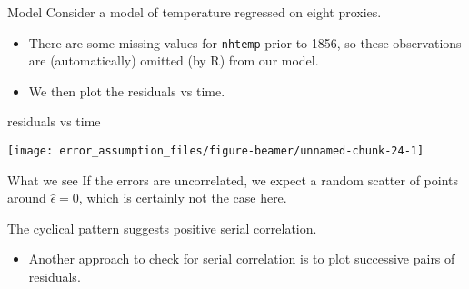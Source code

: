 \begin{frame}[fragile]{Model}
\protect\hypertarget{model}{}
Consider a model of temperature regressed on eight proxies.

\begin{itemize}
\item
  There are some missing values for \texttt{nhtemp} prior to 1856, so
  these observations are (automatically) omitted (by R) from our model.
\item
  We then plot the residuals vs time.
\end{itemize}

\begin{Shaded}
\begin{Highlighting}[]
\NormalTok{)}
\StringTok{ }\OperatorTok{\textasciitilde{}}\StringTok{ }\OperatorTok{+}\StringTok{ }\OperatorTok{+}\StringTok{ }\OperatorTok{+}
\StringTok{          }\OperatorTok{+}\StringTok{ }\OperatorTok{+}\StringTok{ }\OperatorTok{+}\StringTok{ }
\StringTok{          }\OperatorTok{+}\StringTok{ }
\end{Highlighting}
\end{Shaded}
\end{frame}

\begin{frame}[fragile]{residuals vs time}
\protect\hypertarget{residuals-vs-time}{}
\begin{Shaded}
\begin{Highlighting}[]
\NormalTok{(}\OperatorTok{\textasciitilde{}}\StringTok{ }
       \NormalTok{)}
\NormalTok{(} \NormalTok{)}
\end{Highlighting}
\end{Shaded}

\begin{center}\texttt{[image: error\_assumption\_files/figure-beamer/unnamed-chunk-24-1]} \end{center}
\end{frame}

\begin{frame}{What we see}
\protect\hypertarget{what-we-see}{}
If the errors are uncorrelated, we expect a random scatter of points
around \(\hat{\epsilon}=0\), which is certainly not the case here.

The cyclical pattern suggests positive serial correlation.

\begin{itemize}
\tightlist
\item
  Another approach to check for serial correlation is to plot successive
  pairs of residuals.
\end{itemize}
\end{frame}

